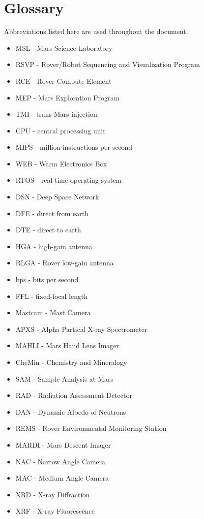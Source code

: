 \chapter*{Glossary}

Abbreviations listed here are used throughout the document.

\begin{itemize}
\item MSL - Mars Science Laboratory
\item RSVP - Rover/Robot Sequencing and Visualization Program
\item RCE - Rover Compute Element
\item MEP - Mars Exploration Program
\item TMI - trans-Mars injection
\item CPU - central processing unit
\item MIPS - million instructions per second
\item WEB - Warm Electronics Box
\item RTOS - real-time operating system
\item DSN - Deep Space Network
\item DFE - direct from earth
\item DTE - direct to earth
\item HGA - high-gain antenna
\item RLGA - Rover low-gain antenna
\item bps - bits per second
\item FFL - fixed-focal length
\item Mastcam - Mast Camera
\item APXS - Alpha Partical X-ray Spectrometer
\item MAHLI - Mars Hand Lens Imager
\item CheMin - Chemistry and Mineralogy
\item SAM - Sample Analysis at Mars
\item RAD - Radiation Assessment Detector
\item DAN - Dynamic Albedo of Neutrons
\item REMS - Rover Environmental Monitoring Station
\item MARDI - Mars Descent Imager
\item NAC - Narrow Angle Camera
\item MAC - Medium Angle Camera
\item XRD - X-ray Diffraction
\item XRF - X-ray Fluorescence

\end{itemize}
